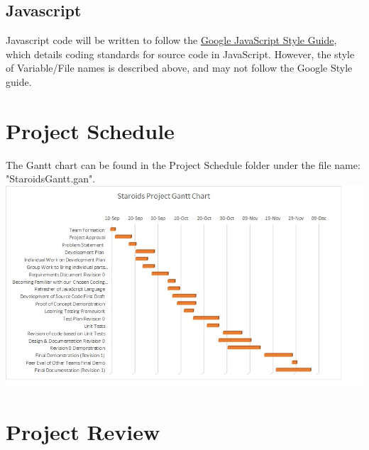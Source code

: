 \documentclass{article}
\begin{document}
\subsection{Javascript}
Javascript code will be written to follow the \href{https://google.github.io/styleguide/jsguide.html}{Google JavaScript Style Guide}, which details coding standards for source code in JavaScript. However, the style of Variable/File names is described above, and may not follow the Google Style guide.

\section{Project Schedule}
The Gantt chart can be found in the Project Schedule folder under the file name: "StaroidsGantt.gan".
\includegraphics[scale=0.75]{gantt.jpg}

\section{Project Review}




\end{document}
